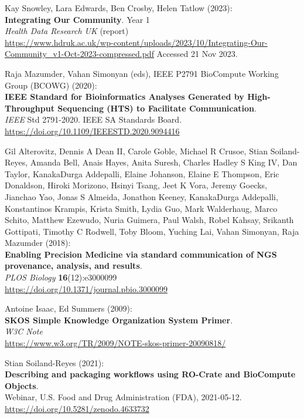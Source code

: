 \documentclass[10pt,letterpaper]{article}
\begin{document}
\begin{thebibliography}{10}
\begin{small}
Kay Snowley, Lara Edwards, Ben Crosby, Helen Tatlow (2023):\\
\textbf{Integrating Our Community}. Year 1 \\
\emph{Health Data Research UK} (report) \\
\url{https://www.hdruk.ac.uk/wp-content/uploads/2023/10/Integrating-Our-Community_v1-Oct-2023-compressed.pdf}
Accessed 21 Nov 2023.

Raja Mazumder, Vahan Simonyan (eds), IEEE P2791 BioCompute Working Group (BCOWG) (2020):\\
\textbf{IEEE Standard for Bioinformatics Analyses Generated by High-Throughput Sequencing (HTS) to Facilitate Communication}.\\
\emph{IEEE} Std 2791-2020. IEEE SA Standards Board.\\
\url{https://doi.org/10.1109/IEEESTD.2020.9094416}


Gil Alterovitz, Dennis A Dean II, Carole Goble, Michael R Crusoe, Stian Soiland-Reyes, Amanda Bell, Anais Hayes, Anita Suresh, Charles Hadley S King IV, Dan Taylor, KanakaDurga Addepalli, Elaine Johanson, Elaine E Thompson, Eric Donaldson, Hiroki Morizono, Hsinyi Tsang, Jeet K Vora, Jeremy Goecks, Jianchao Yao, Jonas S Almeida, Jonathon Keeney, KanakaDurga Addepalli, Konstantinos Krampis, Krista Smith, Lydia Guo, Mark Walderhaug, Marco Schito, Matthew Ezewudo, Nuria Guimera, Paul Walsh, Robel Kahsay, Srikanth Gottipati, Timothy C Rodwell, Toby Bloom, Yuching Lai, Vahan Simonyan, Raja Mazumder (2018):\\
\textbf{Enabling Precision Medicine via standard communication of NGS provenance, analysis, and results}.\\
\emph{PLOS Biology} \textbf{16}(12):e3000099 \\
\url{https://doi.org/10.1371/journal.pbio.3000099}


Antoine Isaac, Ed Summers (2009):\\
\textbf{SKOS Simple Knowledge Organization System Primer}.\\
\emph{W3C Note}\\
\url{https://www.w3.org/TR/2009/NOTE-skos-primer-20090818/} 



Stian Soiland-Reyes (2021):\\
\textbf{Describing and packaging workflows using RO-Crate and BioCompute Objects}.\\
Webinar, U.S. Food and Drug Administration (FDA), 2021-05-12.\\
\url{https://doi.org/10.5281/zenodo.4633732}


\end{small}
\end{thebibliography}
\end{document}
